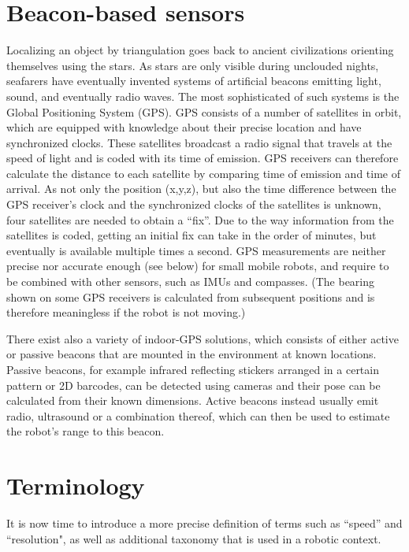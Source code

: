 \section{Beacon-based sensors}
Localizing an object by triangulation goes back to ancient civilizations orienting themselves using the stars. As stars are only visible during unclouded nights, seafarers have eventually invented systems of artificial beacons emitting light, sound, and eventually radio waves. The most sophisticated of such systems is the Global Positioning System (GPS). GPS consists of a number of satellites in orbit, which are equipped with knowledge about their precise location and have synchronized clocks. These satellites broadcast a radio signal that travels at the speed of light and is coded with its time of emission. GPS receivers can therefore calculate the distance to each satellite by comparing time of emission and time of arrival. As not only the position (x,y,z), but also the time difference between the GPS receiver's clock and the synchronized clocks of the satellites is unknown, four satellites are needed to obtain a ``fix''. Due to the way information from the satellites is coded, getting an initial fix can take in the order of minutes, but eventually is available multiple times a second. GPS measurements are neither precise nor accurate enough (see below) for small mobile robots, and require to be combined with other sensors, such as IMUs and compasses. (The bearing shown on some GPS receivers is calculated from subsequent positions and is therefore meaningless if the robot is not moving.) 

There exist also a variety of indoor-GPS solutions, which consists of either active or passive beacons that are mounted in the environment at known locations. Passive beacons, for example infrared reflecting stickers arranged in a certain pattern or 2D barcodes, can be detected using cameras and their pose can be calculated from their known dimensions. Active beacons instead usually emit radio, ultrasound or a combination thereof, which can then be used to estimate the robot's range to this beacon. 
  
\section{Terminology}
It is now time to introduce  a more precise definition of terms such as ``speed'' and ``resolution", as well as additional taxonomy that is used in a robotic context. %

